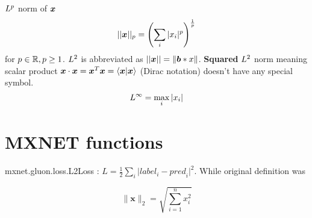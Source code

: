 \documentclass[12pt]{article}
\newcommand{\be}{\begin{equation}}
\newcommand{\ee}{\end{equation}}
\begin{document}
\noindent$L^p$ norm of ${\bm{x}}$
\be || \vx ||_p = \left(\sum_i |x_i|^p\right)^\frac{1}{p}\label{eq_normlp}\ee
for $p \in {\mathbb{R}}, p \ge 1$. $L^2$ is abbreviated as $||{\bm{x}}|| = \norm{{\bm{b}}*{x}}$. {\bf Squared} $L^2$ norm meaning scalar product ${\bm{x}}\cdot{\bm{x}} = {\bm{x}}^T{\bm{x}} =\bra{{\bm{x}}}\ket{{\bm{x}}}$ (Dirac notation) doesn't have any special symbol.
\be \normmax = \max_i|x_i| \ee  

\section{MXNET functions}

mxnet.gluon.loss.L2Loss : $L = \frac{1}{2} \sum_i \vert {label}_i - {pred}_i \vert^2$. While original definition was

\[\|\mathbf{x}\|_2 = \sqrt{\sum_{i=1}^n x_i^2}\]


\end{document}
